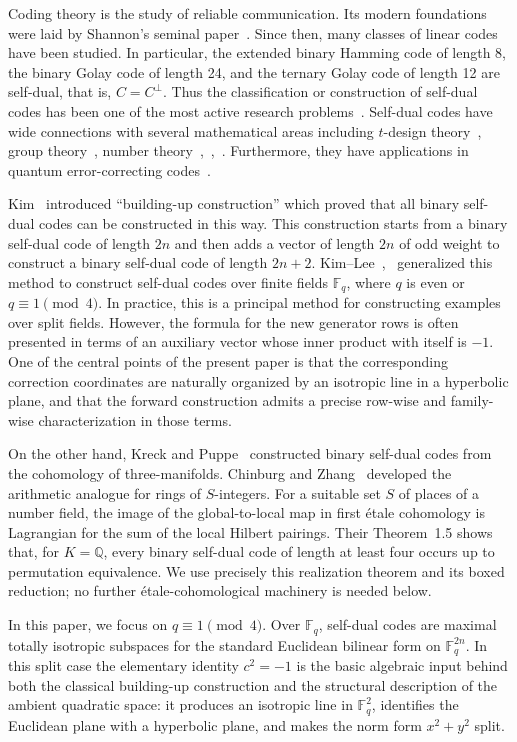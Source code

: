 \documentclass[12pt]{article}
\newcommand{\F}{\mathbb{F}}
\begin{document}
Coding theory is the study of reliable communication. Its modern foundations
were laid by Shannon's seminal paper~\cite{Sha}. Since then, many classes of
linear codes have been studied. In particular, the extended binary Hamming
code of length 8, the binary Golay code of length 24, and the ternary Golay
code of length 12 are self-dual, that is, $C = C^{\perp}$.
Thus the classification or construction of self-dual codes has been one of the most active research problems~\cite{self-dual}.
Self-dual codes have wide connections with several mathematical areas including $t$-design theory~\cite{BacGab}, group theory~\cite{ConSlo}, number theory~\cite{BaDou},~\cite{ConSlo},~\cite{ShiChoShaSol}. Furthermore, they have applications in quantum error-correcting codes~\cite{CRSS}.

Kim~\cite{Kim2001} introduced ``building-up construction'' which proved that all binary self-dual codes can be constructed in this way. This construction starts from a binary self-dual code of length $2n$ and then adds a vector of length $2n$ of odd weight to construct a binary self-dual code of length $2n+2$. Kim--Lee~\cite{KimLee2009},~\cite{KimLee} generalized this method to construct self-dual codes over finite fields $\mathbb F_q$, where $q$ is even or $q \equiv 1 \pmod{4}$.
 In practice, this is a principal method for constructing examples over split fields. However, the formula for the new generator rows is often presented in terms of an auxiliary vector whose inner product with itself is $-1$. One of the central points of the present paper is that the corresponding correction coordinates are naturally organized by an isotropic line in a hyperbolic plane, and that the forward construction admits a precise row-wise and family-wise characterization in those terms.

 On the other hand, Kreck and Puppe~\cite{KreckPuppe} constructed binary
self-dual codes from the cohomology of three-manifolds. Chinburg and
Zhang~\cite{ChinburgZhang} developed the arithmetic analogue for rings of
$S$-integers. For a suitable set $S$ of places of a number field, the image
of the global-to-local map in first \'{e}tale cohomology is Lagrangian for
the sum of the local Hilbert pairings. Their Theorem~1.5 shows that, for
$K=\mathbb Q$, every binary self-dual code of length at least four occurs up
to permutation equivalence. We use precisely this realization theorem and
its boxed reduction; no further \'{e}tale-cohomological machinery is needed
below.

In this paper, we focus on $q \equiv 1 \pmod 4$. Over $\F_q$, self-dual codes are maximal totally isotropic subspaces for the standard Euclidean bilinear form on $\F_q^{2n}$. In this split case the elementary identity $c^2=-1$ is the basic algebraic input behind both the classical building-up construction and the structural description of the ambient quadratic space: it produces an isotropic line in $\F_q^2$, identifies the Euclidean plane with a hyperbolic plane, and makes the norm form $x^2+y^2$ split.
\end{document}
